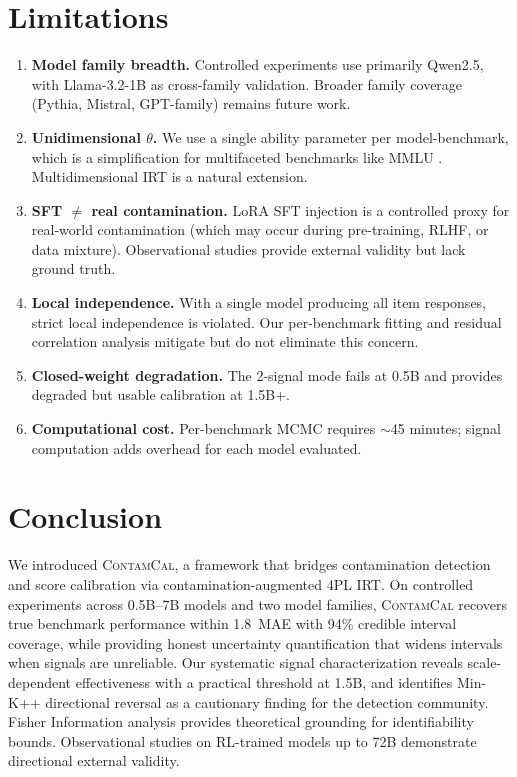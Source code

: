 \documentclass[11pt,a4paper]{article}
\newcommand{\contamcal}{\textsc{ContamCal}}
\newcommand{\pp}{\,\text{pp}}
\begin{document}
\section{Limitations}
\label{sec:limitations}

\begin{enumerate}
\item \textbf{Model family breadth.} Controlled experiments use primarily Qwen2.5, with Llama-3.2-1B as cross-family validation. Broader family coverage (Pythia, Mistral, GPT-family) remains future work.
\item \textbf{Unidimensional $\theta$.} We use a single ability parameter per model-benchmark, which is a simplification for multifaceted benchmarks like MMLU \citep{reckase2009multidimensional}. Multidimensional IRT is a natural extension.
\item \textbf{SFT $\neq$ real contamination.} LoRA SFT injection is a controlled proxy for real-world contamination (which may occur during pre-training, RLHF, or data mixture). Observational studies provide external validity but lack ground truth.
\item \textbf{Local independence.} With a single model producing all item responses, strict local independence is violated. Our per-benchmark fitting and residual correlation analysis mitigate but do not eliminate this concern.
\item \textbf{Closed-weight degradation.} The 2-signal mode fails at 0.5B and provides degraded but usable calibration at 1.5B+.
\item \textbf{Computational cost.} Per-benchmark MCMC requires $\sim$45 minutes; signal computation adds overhead for each model evaluated.
\end{enumerate}

\section{Conclusion}
\label{sec:conclusion}

We introduced \contamcal{}, a framework that bridges contamination detection and score calibration via contamination-augmented 4PL IRT.
On controlled experiments across 0.5B--7B models and two model families, \contamcal{} recovers true benchmark performance within 1.8\pp{} MAE with 94\% credible interval coverage, while providing honest uncertainty quantification that widens intervals when signals are unreliable.
Our systematic signal characterization reveals scale-dependent effectiveness with a practical threshold at 1.5B, and identifies Min-K++ directional reversal as a cautionary finding for the detection community.
Fisher Information analysis provides theoretical grounding for identifiability bounds.
Observational studies on RL-trained models up to 72B demonstrate directional external validity.
\end{document}
